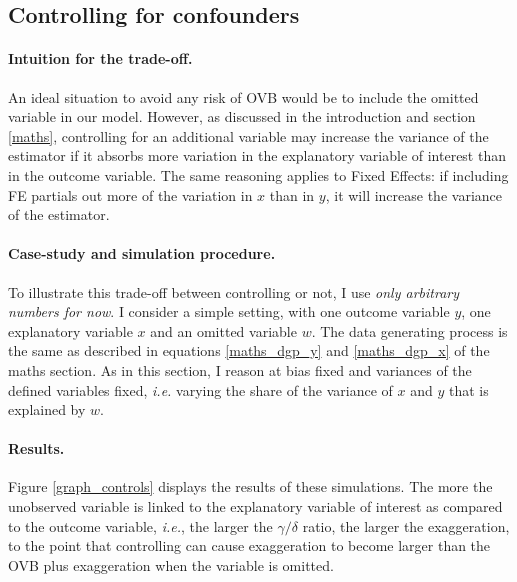 \documentclass[usletter, 12pt]{article}
\begin{document}
		
		
		 \subsection{Controlling for confounders}
		
     			\paragraph{Intuition for the trade-off.} An ideal situation to avoid any risk of OVB would be to include the omitted variable in our model. However, as discussed in the introduction and section \ref{maths}, controlling for an additional variable may increase the variance of the estimator if it absorbs more variation in the explanatory variable of interest than in the outcome variable.
			The same reasoning applies to Fixed Effects: if including FE partials out more of the variation in $x$ than in $y$, it will increase the variance of the estimator.
			
			\paragraph{Case-study and simulation procedure.} To illustrate this trade-off between controlling or not, I use \textit{only arbitrary numbers for now}. I consider a simple setting, with one outcome variable $y$, one explanatory variable $x$ and an omitted variable $w$. The data generating process is the same as described in equations \ref{maths_dgp_y} and \ref{maths_dgp_x} of the maths section. As in this section, I reason at bias fixed and variances of the defined variables fixed, \textit{i.e.} varying the share of the variance of $x$ and $y$ that is explained by $w$.
			
			\paragraph{Results.}  Figure \ref{graph_controls} displays the results of these simulations. The more the unobserved variable is linked to the explanatory variable of interest as compared to the outcome variable, \textit{i.e.}, the larger the $\gamma/\delta$ ratio, the larger the exaggeration, to the point that controlling can cause exaggeration to become larger than the OVB plus exaggeration when the variable is omitted.
        
\end{document}
